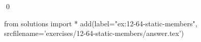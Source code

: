
\begin{ex}
  \label{ex:12-64-static-members}
  
  \qed
\end{ex}
\begin{python0}
from solutions import *
add(label="ex:12-64-static-members",
    srcfilename='exercises/12-64-static-members/answer.tex')
\end{python0}
